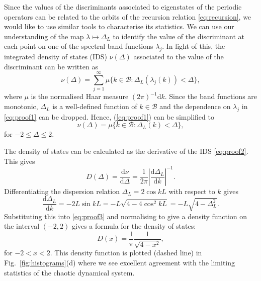\documentclass[nofootinbib,prb,amsmath,amssymb,twocolumn,floatfix]{revtex4-2}
\theoremstyle{definition}
\newcommand{\dd}[2]{\frac{\mathrm{d}#1}{\mathrm{d}#2}}
\begin{document}
Since the values of the discriminants associated to eigenstates of the periodic operators can be related to the orbits of the recursion relation \eqref{eq:recursion}, we would like to use similar tools to characterise its statistics. We can use our understanding of the map $\lambda\mapsto\Delta_L$ to identify the value of the discriminant at each point on one of the spectral band functions $\lambda_j$. In light of this, the integrated density of states (IDS) $\nu(\Delta)$ associated to the value of the discriminant can be written as 
\begin{equation} \label{eq:proof1}
	\nu(\Delta) = \sum_{j=1}^\infty \mu\{k\in\mathcal{B}:\Delta_L(\lambda_j(k))<\Delta\},
\end{equation}
where $\mu$ is the normalised Haar measure $(2\pi)^{-1}\mathrm{d} k$. Since the band functions are monotonic, $\Delta_L$ is a well-defined function of $k\in\mathcal{B}$ and the dependence on $\lambda_j$ in \eqref{eq:proof1} can be dropped. Hence, (\ref{eq:proof1}) can be simplified to
\begin{equation} \label{eq:proof2}
	\nu(\Delta) = \mu\{k\in\mathcal{B}:\Delta_L(k)<\Delta\},
\end{equation}
for $-2\leq\Delta\leq2$.

The density of states can be calculated as the derivative of the IDS \eqref{eq:proof2}. This gives
\begin{equation} \label{eq:proof3}
	D(\Delta)=\dd{\nu}{\Delta}=\frac{1}{2\pi} \left|\dd{\Delta_L}{k}\right|^{-1}.
\end{equation}
Differentiating the dispersion relation $\Delta_L=2\cos kL$ with respect to $k$ gives
\begin{equation*}
	\dd{\Delta_L}{k}=-2L\sin kL=-L\sqrt{4-4\cos^2kL}=-L\sqrt{4-\Delta_L^2}.
\end{equation*}
Substituting this into \eqref{eq:proof3} and normalising to give a density function on the interval $(-2,2)$ gives a formula for the density of states:
\begin{equation} \label{eq:main}
	D(x)=\frac{1}{\pi}\frac{1}{\sqrt{4-x^2}},
\end{equation}
for $-2<x<2$. This density function is plotted (dashed line) in Fig.~\ref{fig:histograms}(d) where we see excellent agreement with the limiting statistics of the chaotic dynamical system. 
\end{document}
